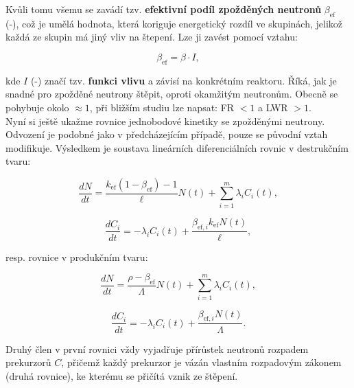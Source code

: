 Kvůli tomu všemu se zavádí tzv. \textbf{efektivní podíl zpožděných neutronů} $\beta_{\text{ef}}$ (-), což je umělá hodnota, která koriguje energetický rozdíl ve skupinách, jelikož každá ze skupin má jiný vliv na štepení. Lze ji zavést pomocí vztahu:

\begin{equation}
  \beta_{\text{ef}} = \beta \cdot I,
\end{equation}

kde $I$ (-) značí tzv. \textbf{funkci vlivu} a závisí na konkrétním reaktoru. Říká, jak je snadné pro zpožděné neutrony štěpit, oproti okamžitým neutronům. Obecně se pohybuje okolo $\approx 1$, při bližším studiu lze napsat: FR $<1$ a LWR $>1$.\\

Nyní si ještě ukažme rovnice jednobodové kinetiky se zpožděnými neutrony. Odvození je podobné jako v předcházejícím případě, pouze se původní vztah modifikuje. Výsledkem je soustava lineárních diferenciálních rovnic v destrukčním tvaru:

\begin{equation}
  \boxed{
  \dfrac{dN}{dt} = \dfrac{k_{\text{ef}}(1-\beta_{\text{ef}})-1}{\ell} N(t) + \sum_{i=1}^m \lambda_i C_i(t),
  \label{rovnice_kinetiky_zpozdenky_1}}
\end{equation}

\begin{equation}
  \boxed{
  \dfrac{dC_i}{dt} = -\lambda_i C_i(t) + \dfrac{\beta_{\text{ef},i} k_{\text{ef}} N(t)}{\ell},
  \label{rovnice_kinetiky_zpozdenky_2}}
\end{equation}

resp. rovnice v produkčním tvaru:

\begin{equation}
  \boxed{
  \dfrac{dN}{dt} = \dfrac{\rho - \beta_{\text{ef}}}{\Lambda} N(t) + \sum_{i=1}^m \lambda_i C_i(t),
  \label{rovnice_kinetiky_zpozdenky_3}}
\end{equation}

\begin{equation}
  \boxed{
  \dfrac{dC_i}{dt} = -\lambda_i C_i(t) + \dfrac{\beta_{\text{ef},i}  N(t)}{\Lambda}.
  \label{rovnice_kinetiky_zpozdenky_4}}
\end{equation}

Druhý člen v první rovnici vždy vyjadřuje přírůstek neutronů rozpadem prekurzorů $C$, přičemž každý prekurzor je vázán vlastním rozpadovým zákonem (druhá rovnice), ke kterému se přičítá vznik ze štěpení.

